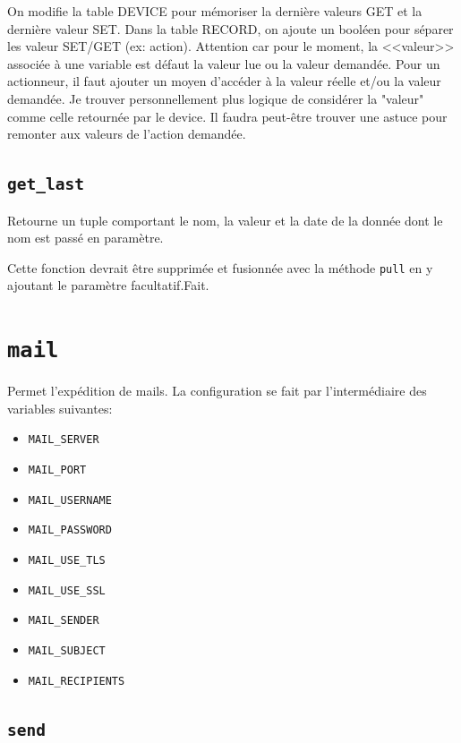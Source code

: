 {\color{green}On modifie la table DEVICE pour mémoriser la dernière valeurs GET et la dernière valeur SET. Dans la table RECORD, on  ajoute un booléen pour séparer les valeur SET/GET (ex: action).
Attention car pour le moment, la <<valeur>> associée à une variable est défaut la valeur lue ou la valeur demandée. Pour un actionneur, il faut ajouter un moyen d'accéder à la valeur réelle et/ou la valeur demandée. Je trouver personnellement plus logique de considérer la "valeur" comme celle retournée par le device. Il faudra peut-être trouver une astuce pour remonter aux valeurs de l'action demandée.}



\subsection{\lstinline|get_last|}

Retourne un tuple comportant le nom, la valeur et la date de la donnée dont le nom est passé en paramètre.

{\color{red}Cette fonction devrait être supprimée et fusionnée avec la méthode \lstinline|pull| en y ajoutant le paramètre facultatif.}{\color{green}Fait}.

\section{\lstinline|mail|}

Permet l'expédition de mails. La configuration se fait par l'intermédiaire des variables suivantes:
\begin{itemize}
	\item \lstinline|MAIL_SERVER|
	\item \lstinline|MAIL_PORT|
	\item \lstinline|MAIL_USERNAME|
	\item \lstinline|MAIL_PASSWORD|
	\item \lstinline|MAIL_USE_TLS|
	\item \lstinline|MAIL_USE_SSL|
	\item \lstinline|MAIL_SENDER|
	\item \lstinline|MAIL_SUBJECT|
	\item \lstinline|MAIL_RECIPIENTS|
\end{itemize}

\subsection{\lstinline|send|}

